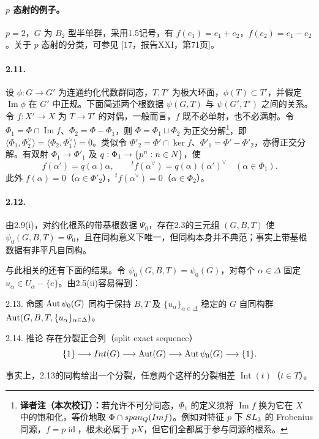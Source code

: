 \paragraph*{$p$ 态射的例子。} $p=2$，$G$ 为 $B_2$ 型半单群，采用1.5记号，有 $f(e_1)=e_1+e_2$，$f(e_2)=e_1-e_2$。关于 $p$ 态射的分类，可参见 [17，报告XXI，第71页]。
\paragraph*{2.11.} 设 $\phi:G\to G'$ 为连通约化代数群同态，$T,T'$ 为极大环面，$\phi(T)\subset T'$，并假定 $\operatorname{Im}\phi$ 在 $G'$ 中正规。下面简述两个根数据 $\psi(G,T)$ 与 $\psi(G',T')$ 之间的关系。令 $f:X'\to X$ 为 $T\to T'$ 的对偶，一般而言，$f$ 既不必单射，也不必满射。令 $\Phi_1=\Phi\cap\operatorname{Im}f$、$\Phi_2=\Phi-\Phi_1$，则 $\Phi=\Phi_1\sqcup\Phi_2$ 为正交分解\footnote{\textbf{译者注（本次校订）：}若允许不可分同态，$\Phi_1$ 的定义须将 $\operatorname{Im}f$ 换为它在 $X$ 中的饱和化，等价地取 $\Phi\cap span_{Q}(Imf)$。例如对特征 $p$ 下 $SL_3$ 的 Frobenius 同源，$f=p\operatorname{id}$，根未必属于 $pX$，但它们全都属于参与同源的根系。}，即 $\langle\Phi_1,\Phi_2^\vee\rangle=\langle\Phi_2,\Phi_1^\vee\rangle=0$。类似令 $\Phi'_2=\Phi'\cap\ker f$、$\Phi'_1=\Phi'-\Phi'_2$，亦得正交分解。有双射 $\Phi_1\to\Phi'_1$ 及 $q:\Phi_1\to\{p^n:n\in N\}$，使
\[
 f(\alpha')=q(\alpha)\alpha,\qquad{}^tf(\alpha^\vee)=q(\alpha)(\alpha')^\vee
 \quad(\alpha\in\Phi_1).
\]
此外 $f(\alpha)=0$（$\alpha\in\Phi'_2$），${}^tf(\alpha^\vee)=0$（$\alpha\in\Phi_2$）。
\paragraph*{2.12.} 由2.9(i)，对约化根系的带基根数据 $\Psi_0$，存在2.3的三元组 $(G,B,T)$ 使 $\psi_0(G,B,T)=\Psi_0$，且在同构意义下唯一，但同构本身并不典范；事实上带基根数据有非平凡自同构。

与此相关的还有下面的结果。令 $\psi_0(G,B,T)=\psi_0(G)$，对每个 $\alpha\in\Delta$ 固定 $u_\alpha\in U_\alpha-\{e\}$。由2.5(ii)容易得到：
\begin{originaltheorem}{2.13. 命题}
$\Aut\psi_0(G)$ 同构于保持 $B,T$ 及 $\{u_\alpha\}_{\alpha\in\Delta}$ 稳定的 $G$ 自同构群 $\Aut(G,\allowbreak B,\allowbreak T,\allowbreak\{u_\alpha\}_{\alpha\in\Delta})$。
\end{originaltheorem}
\begin{originaltheorem}{2.14. 推论}
存在分裂正合列（split exact sequence）
\[
 \{1\}\longrightarrow\operatorname{Int}(G)\longrightarrow\Aut(G)
 \longrightarrow\Aut\psi_0(G)\longrightarrow\{1\}.
\]
\end{originaltheorem}
事实上，2.13的同构给出一个分裂，任意两个这样的分裂相差 $\operatorname{Int}(t)$（$t\in T$）。
